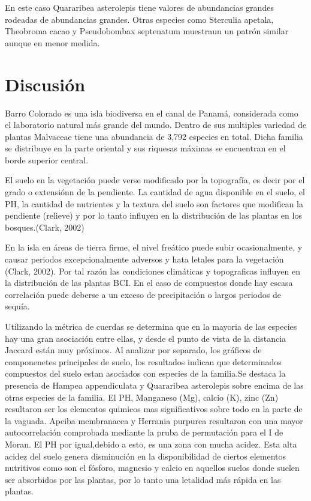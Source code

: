 \documentclass[11pt,]{article}
\begin{document}
En este caso Quararibea asterolepis tiene valores de abundancias grandes
rodeadas de abundancias grandes. Otras especies como Sterculia apetala,
Theobroma cacao y Pseudobombax septenatum muestraun un patrón similar
aunque en menor medida.

\section{Discusión}\label{discusiuxf3n}

Barro Colorado es una isla biodiversa en el canal de Panamá, considerada
como el laboratorio natural más grande del mundo. Dentro de sus
multiples variedad de plantas Malvaceae tiene una abundancia de 3,792
especies en total. Dicha familia se distribuye en la parte oriental y
sus riquesas máximas se encuentran en el borde superior central.

El suelo en la vegetación puede verse modificado por la topografía, es
decir por el grado o extensiónn de la pendiente. La cantidad de agua
disponible en el suelo, el PH, la cantidad de nutrientes y la textura
del suelo son factores que modifican la pendiente (relieve) y por lo
tanto influyen en la distribución de las plantas en los bosques.(Clark,
2002)

En la isla en áreas de tierra firme, el nivel freático puede subir
ocasionalmente, y causar periodos excepcionalmente adversos y hata
letales para la vegetación (Clark, 2002). Por tal razón las condiciones
climáticas y topograficas influyen en la distribución de las plantas
BCI. En el caso de compuestos donde hay escasa correlación puede deberse
a un exceso de precipitación o largos periodos de sequía.

Utilizando la métrica de cuerdas se determina que en la mayoria de las
especies hay una gran asociación entre ellas, y desde el punto de vista
de la distancia Jaccard están muy próximos. Al analizar por separado,
los gráficos de componenetes principales de suelo, los resultados
indican que determinados compuestos del suelo estan asociados con
especies de la familia.Se destaca la presencia de Hampea appendiculata y
Quararibea asterolepis sobre encima de las otras especies de la familia.
El PH, Manganeso (Mg), calcio (K), zinc (Zn) resultaron ser los
elementos quimicos mas significativos sobre todo en la parte de la
vaguada. Apeiba membranacea y Herrania purpurea resultaron con una mayor
autocorrelación comprobada mediante la pruba de permutación para el I de
Moran. El PH por igual,debido a esto, es una zona con mucha acidez. Esta
alta acidez del suelo genera disminución en la disponibilidad de ciertos
elementos nutritivos como son el fósforo, magnesio y calcio en aquellos
suelos donde suelen ser absorbidos por las plantas, por lo tanto una
letalidad más rápida en las plantas.
\end{document}
